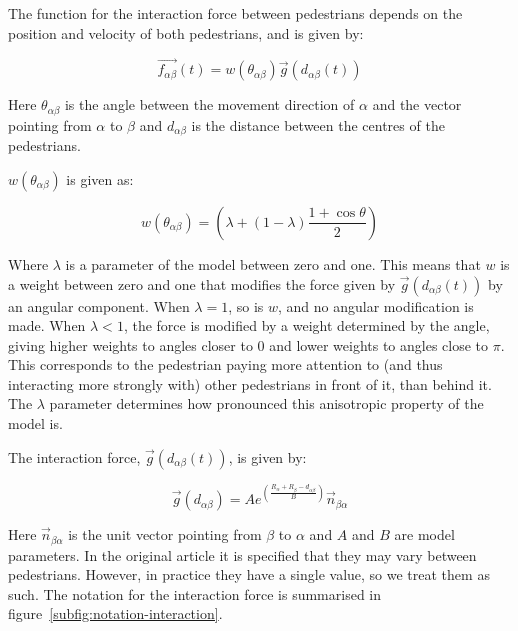 The function for the interaction force between pedestrians depends on the 
position and velocity of both pedestrians, and is given by:

\begin{equation}
    \overrightarrow{f_{\alpha \beta }}(t) = 
    w\left(\theta_{\alpha \beta}\right)
    \overrightarrow{g}\left(d_{\alpha \beta}(t)\right)
    \label{eq:pedestrianinteraction}
\end{equation}

Here $\theta_{\alpha \beta}$ is the angle between the movement direction of 
$\alpha$ and the vector pointing from $\alpha$ to $\beta$ and $d_{\alpha 
\beta}$ is the distance between the centres of the pedestrians. 

$ w(\theta_{\alpha \beta})$ is given as: 

\begin{equation}
    w\left(\theta_{\alpha \beta}\right)=
    \left(
        \lambda + \left(
            1 - \lambda
        \right)
		\frac{1+\cos{\theta}}{2}
    \right) 
    \label{angleAB}
\end{equation}

Where $\lambda$ is a parameter of the model between zero and one. This means 
that $w$ is a weight between zero and one that modifies the force given by 
$\overrightarrow{g}\left(d_{\alpha \beta}(t)\right)$ by an angular component.  
When $\lambda=1$, so is $w$, and no angular modification is made. When 
$\lambda<1$, the force is modified by a weight determined by the angle, giving 
higher weights to angles closer to $0$ and lower weights to angles close to 
$\pi$. This corresponds to the pedestrian paying more attention to (and thus 
interacting more strongly with) other pedestrians in front of it, than behind 
it. The $\lambda$ parameter determines how pronounced this anisotropic 
property of the model is.


The interaction force, $\overrightarrow{g}\left(d_{\alpha \beta} (t)\right)$, is 
given by:  

\begin{equation}
    \overrightarrow{g} 
    \left(
        d_{\alpha \beta}
    \right)
    =
    A e^{ \left(
        \frac{ R_\alpha + R_\beta - d_{\alpha \beta}}
             {B}
    \right)}
    \overrightarrow{n}_{\beta \alpha}
    \label{re}	
\end{equation}

Here $\overrightarrow{n}_{\beta \alpha}$ is the unit vector pointing from 
$\beta$ to $\alpha$ and $A$ and $B$ are model parameters. In the original 
article it is specified that they may vary between pedestrians. However, in 
practice they have a single value, so we treat them as such. The notation for 
the interaction force is summarised in 
figure~\ref{subfig:notation-interaction}.

